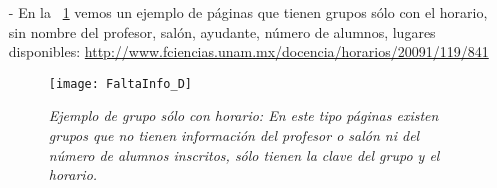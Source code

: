 \begin{itemize}
\item[-] En la \figurename{~\ref{SoloHorario}} vemos un ejemplo de páginas que tienen grupos sólo con el horario, sin nombre del profesor, salón, ayudante, número de alumnos, lugares disponibles: \url{http://www.fciencias.unam.mx/docencia/horarios/20091/119/841} %

\begin{figure}[H]
\centering
\texttt{[image: FaltaInfo\_D]} %
\caption[\textit{Ejemplo de grupo sólo con horario}]{\textit{Ejemplo de grupo sólo con horario: En este tipo páginas existen grupos que no tienen información del profesor o salón ni del número de alumnos inscritos, sólo tienen la clave del grupo y el horario.}}\label{SoloHorario}
\end{figure}
\end{itemize}